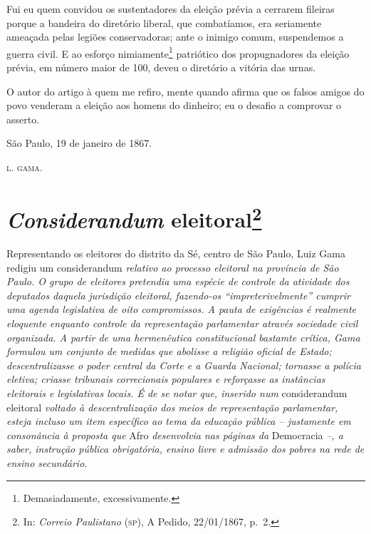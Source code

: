 Fui eu quem convidou os sustentadores da eleição prévia a cerrarem
fileiras porque a bandeira do diretório liberal, que combatíamos, era
seriamente ameaçada pelas legiões conservadoras; ante o inimigo comum,
suspendemos a guerra civil. E ao esforço nimiamente\footnote{Demasiadamente,
  excessivamente.} patriótico dos propugnadores da eleição prévia, em
número maior de 100, deveu o diretório a vitória das urnas.

O autor do artigo à quem me refiro, mente quando afirma que os falsos
amigos do povo venderam a eleição aos homens do dinheiro; eu o desafio a
comprovar o asserto.
\begin{flushright}
São Paulo, 19 de janeiro de 1867.

\textsc{l. gama.}
\end{flushright}
\chapter{\emph{Considerandum} eleitoral\footnote{In: \emph{Correio
  Paulistano} (\textsc{sp}), A Pedido, 22/01/1867, p.~2.}}

\begin{didascalia}
Representando os eleitores do distrito da Sé, centro de São Paulo, Luiz
Gama redigiu um considerandum \emph{relativo ao processo eleitoral na
província de São Paulo. O grupo de eleitores pretendia uma espécie de
controle da atividade dos deputados daquela jurisdição eleitoral,
fazendo-os ``impreterivelmente'' cumprir uma agenda legislativa de oito
compromissos. A pauta de exigências é realmente eloquente enquanto
controle da representação parlamentar através sociedade civil
organizada. A partir de uma hermenêutica constitucional bastamte
crítica, Gama formulou um conjunto de medidas que abolisse a religião
oficial de Estado; descentralizasse o poder central da Corte e a Guarda
Nacional; tornasse a polícia eletiva; criasse tribunais correcionais
populares e reforçasse as instâncias eleitorais e legislativas locais. É
de se notar que, inserido num} considerandum eleitoral \emph{voltado à
descentralização dos meios de representação parlamentar, esteja incluso
um item específico ao tema da educação pública -- justamente em
consonância à proposta que} Afro \emph{desenvolvia nas páginas da}
Democracia \emph{--, a saber, instrução pública obrigatória, ensino
livre e admissão dos pobres na rede de ensino secundário.}
\end{didascalia}



